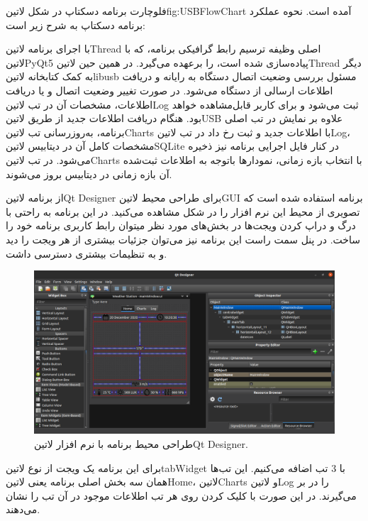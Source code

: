 فلوچارت برنامه دسکتاپ در شکل ‌لاتین{fig:USBFlowChart} آمده است. نحوه عملکرد برنامه دسکتاپ به شرح زیر است:

با اجرای برنامه ‌لاتین{Thread} اصلی وظیفه ترسیم رابط گرافیکی برنامه، که با ‌لاتین{PyQt5} پیاده‌سازی شده است، را برعهده می‌گیرد.
در همین حین ‌لاتین{Thread} دیگر به کمک کتابخانه ‌لاتین{libusb} مسئول بررسی وضعیت اتصال دستگاه به رایانه و دریافت اطلاعات ارسالی از دستگاه می‌شود.
در صورت تغییر وضعیت اتصال و یا دریافت اطلاعات، مشخصات آن در تب ‌لاتین{Log} ثبت می‌شود و برای کاربر قابل‌مشاهده خواهد بود.
هنگام دریافت اطلاعات جدید از طریق ‌لاتین{USB} علاوه بر نمایش در تب اصلی برنامه، به‌روزرسانی تب ‌لاتین{Charts} با اطلاعات جدید و ثبت رخ داد در تب ‌لاتین{Log}، مشخصات کامل آن در دیتابیس ‌لاتین{SQLite} در کنار فایل اجرایی برنامه نیز ذخیره می‌شود. 
در تب ‌لاتین{Charts} با انتخاب بازه زمانی، نمودارها باتوجه به اطلاعات ثبت‌شده آن بازه زمانی در دیتابیس بروز می‌شوند.

از برنامه ‌لاتین{Qt Designer} برای طراحی محیط ‌لاتین{GUI} برنامه استفاده شده است که تصویری از محیط این نرم افزار را در شکل  مشاهده می‌کنید. در این برنامه به راحتی با درگ و دراپ کردن ویجت‌ها در بخش‌های مورد نظر میتوان رابط کاربری برنامه خود را ساخت. در پنل سمت راست این برنامه نیز می‌توان جزئیات بیشتری از هر ویجت را دید و به تنظیمات بیشتری دسترسی داشت. 

\begin{figure}[!h]
	\includegraphics[width=\linewidth]{Assets/qtDesigner.png}
	\caption{طراحی محیط برنامه با نرم افزار ‌لاتین{Qt Designer}.}
	\label{fig:qtDesigner}
\end{figure}

برای این برنامه یک ویجت از نوع ‌لاتین{tabWidget} با 3 تب اضافه می‌کنیم. این تب‌ها همان سه بخش اصلی برنامه یعنی ‌لاتین{Home}، ‌لاتین{Charts} و ‌لاتین{Log} را در بر می‌گیرند. در این صورت با کلیک کردن روی هر تب اطلاعات موجود در آن تب را نشان می‌دهند.  

